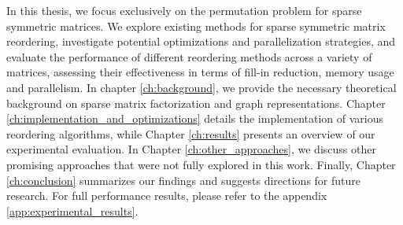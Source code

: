 In this thesis, we focus exclusively on the permutation problem for sparse symmetric matrices. We explore existing methods for sparse symmetric matrix reordering, investigate potential optimizations and parallelization strategies, and evaluate the performance of different reordering methods across a variety of matrices, assessing their effectiveness in terms of fill-in reduction, memory usage and parallelism. In chapter \ref{ch:background}, we provide the necessary theoretical background on sparse matrix factorization and graph representations. Chapter \ref{ch:implementation_and_optimizations} details the implementation of various reordering algorithms, while Chapter \ref{ch:results} presents an overview of our experimental evaluation. In Chapter \ref{ch:other_approaches}, we discuss other promising approaches that were not fully explored in this work. Finally, Chapter \ref{ch:conclusion} summarizes our findings and suggests directions for future research. For full performance results, please refer to the appendix \ref{app:experimental_results}.






